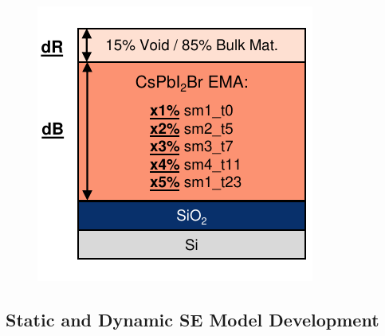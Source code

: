\begin{figure}
  \centering
  \medskip
  \includegraphics[width=.45\textwidth]{chapters/ellipsometry/image/Dynamic_Model.pdf}
  \caption{}
  \label{fig:ellipsometry:dynamic_model}
\end{figure}



\subsection{Static and Dynamic SE Model Development}


